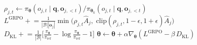 \documentclass[11pt]{article}
\begin{document}
\begin{algorithm}[p]
\begin{minipage}[t]{0.68\linewidth}
\begin{algorithmic}[1]
                    \State $\rho_{j,t} \gets \pi_{\boldsymbol{\theta}}(o_{j,t} \mid \mathbf{q}, \mathbf{o}_{j,<t}) / \pi_{\boldsymbol{\theta}_k}(o_{j,t} \mid \mathbf{q}, \mathbf{o}_{j,<t})$
                    \State $L^{\text{GRPO}} \mathrel{+}= \frac{1}{|\mathcal{B}||\mathbf{o}_j|} \min\!\big(\rho_{j,t} \hat{A}_j,\; \text{clip}(\rho_{j,t}, 1{-}\epsilon, 1{+}\epsilon) \hat{A}_j\big)$
                    \State $D_{\text{KL}} \mathrel{+}= \frac{1}{|\mathcal{B}|} \big[\frac{\pi_{\boldsymbol{\theta}}}{\pi_{\text{ref}}} - \log \frac{\pi_{\boldsymbol{\theta}}}{\pi_{\text{ref}}} - 1\big]$
                \EndFor
            \EndFor
            \State $\boldsymbol{\theta} \gets \boldsymbol{\theta} + \alpha \nabla_{\boldsymbol{\theta}} (L^{\text{GRPO}} - \beta\, D_{\text{KL}})$
        \EndFor
    \EndFor
\EndFor
\end{algorithmic}
\end{minipage}
\end{algorithm}
\end{document}
